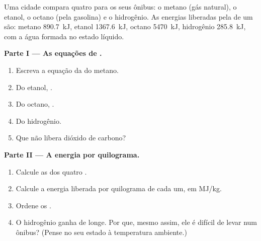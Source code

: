\begin{problem}
\label{pb:g11:reaction-energy:1}
Uma cidade compara quatro  para os seus ônibus: o metano (gás
natural), o etanol, o octano (pela gasolina) e o hidrogênio. As energias
liberadas pela  de um  são: metano
\qty{890.7}{kJ}, etanol \qty{1367.6}{kJ}, octano \qty{5470}{kJ},
hidrogênio \qty{285.8}{kJ}, com a água formada no estado líquido.

\medskip
\noindent\textbf{Parte I --- As equações de .}
\begin{enumerate}
  \item Escreva a equação da  do metano.
  \item Do etanol, .
  \item Do octano, .
  \item Do hidrogênio.
  \item Que  não libera dióxido de carbono?
\end{enumerate}

\medskip
\noindent\textbf{Parte II --- A energia por quilograma.}
\begin{enumerate}[resume]
  \item Calcule as  dos quatro .
  \item Calcule a energia liberada por quilograma de cada um, em
        \si{MJ/kg}.
  \item Ordene os .
  \item O hidrogênio ganha de longe. Por que, mesmo assim, ele é difícil
        de levar num ônibus? (Pense no seu estado à temperatura
        ambiente.)
\end{enumerate}


\end{problem}
